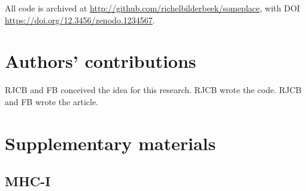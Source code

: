 \documentclass{article}
\newcommand{\richel}[1]{\textcolor{orange}{\textbf{[RB: #1]}}}
\begin{document}
All code is archived at \url{http://github.com/richelbilderbeek/someplace},
with DOI \url{https://doi.org/12.3456/zenodo.1234567}.

\section{Authors' contributions}

RJCB and FB conceived the idea for this research. 
RJCB wrote the code.
RJCB and FB wrote the article.





\appendix
\section{Supplementary materials}

\subsection{MHC-I}

\begin{table}
  
  \caption{
    Percentage of MHC-I epitopes overlapping with transmembrane helix.
    \richel{This is simulated data}
  }
  \label{table:bbbq_1_percentages}
\end{table}

\begin{table}
  
  \caption{
    Kolmogorov-Smirnov test results comparing human and COVID-19 for MHC-I
    \richel{Done on the simulated data}
  }
  \label{table:bbbq_1_stats_covid}
\end{table}

\begin{table}
  
  \caption{
    Kolmogorov-Smirnov test results comparing human and Mycobacterium for MHC-I
    \richel{Done on the simulated data}
  }
  \label{table:bbbq_1_stats_myco}
\end{table}
\end{document}
